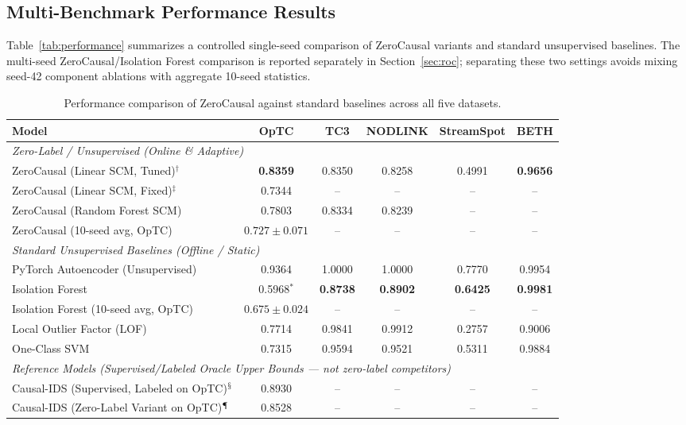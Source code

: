 \subsection{Multi-Benchmark Performance Results}
Table~\ref{tab:performance} summarizes a controlled single-seed comparison of ZeroCausal variants and standard unsupervised baselines. The multi-seed ZeroCausal/Isolation Forest comparison is reported separately in Section~\ref{sec:roc}; separating these two settings avoids mixing seed-42 component ablations with aggregate 10-seed statistics.

\begin{table}[t]
\centering
\caption{Performance comparison of ZeroCausal against standard baselines across all five datasets.}
\begin{tabularx}{\textwidth}{Xccccc}
\toprule
Model & OpTC & TC3 & NODLINK & StreamSpot & BETH \\
\midrule
\multicolumn{6}{l}{\textit{Zero-Label / Unsupervised (Online \& Adaptive)}} \\
ZeroCausal (Linear SCM, Tuned)$^\dagger$ & \textbf{0.8359} & 0.8350 & 0.8258 & 0.4991 & \textbf{0.9656} \\
ZeroCausal (Linear SCM, Fixed)$^\ddagger$ & 0.7344 & -- & -- & -- & -- \\
ZeroCausal (Random Forest SCM) & 0.7803 & 0.8334 & 0.8239 & -- & -- \\
ZeroCausal (10-seed avg, OpTC) & $0.727{\pm}0.071$ & -- & -- & -- & -- \\
\midrule
\multicolumn{6}{l}{\textit{Standard Unsupervised Baselines (Offline / Static)}} \\
PyTorch Autoencoder (Unsupervised) & 0.9364 & 1.0000 & 1.0000 & 0.7770 & 0.9954 \\
Isolation Forest & 0.5968$^*$ & \textbf{0.8738} & \textbf{0.8902} & \textbf{0.6425} & \textbf{0.9981} \\
Isolation Forest (10-seed avg, OpTC) & $0.675{\pm}0.024$ & -- & -- & -- & -- \\
Local Outlier Factor (LOF) & 0.7714 & 0.9841 & 0.9912 & 0.2757 & 0.9006 \\
One-Class SVM & 0.7315 & 0.9594 & 0.9521 & 0.5311 & 0.9884 \\
\midrule
\multicolumn{6}{l}{\textit{Reference Models (Supervised/Labeled Oracle Upper Bounds --- not zero-label competitors)}} \\
Causal-IDS (Supervised, Labeled on OpTC)$^\mathsection$ & 0.8930 & -- & -- & -- & -- \\
Causal-IDS (Zero-Label Variant on OpTC)$^\mathparagraph$ & 0.8528 & -- & -- & -- & -- \\

\end{tabularx}
\end{table}
